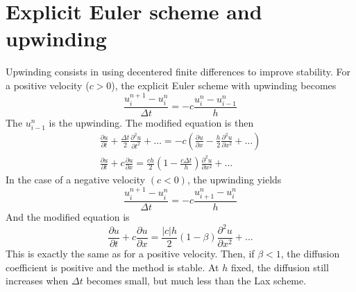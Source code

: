 \documentclass[12pt, openany]{report}
\theoremstyle{definition}
\begin{document}
\section{Explicit Euler scheme and upwinding}
Upwinding consists in using decentered finite differences to improve stability. 
For a positive velocity ($c>0$), the explicit Euler scheme with upwinding becomes 
\begin{equation}
	\frac{u_i^{n+1}-u_i^n}{\Delta t} = -c\frac{u_i^n - u_{i-1}^n}{h}
\end{equation}
The $u_{i-1}^n$ is the upwinding. The modified equation is then 
\begin{equation}
	\begin{aligned}		
		\frac{\partial u}{\partial t} + \frac{\Delta t}{2}\frac{\partial^2u}{\partial t^2} + \dots = -c\left(\frac{\partial u}{\partial x}-\frac{h}{2}\frac{\partial^2 u}{\partial x^2} + \dots\right)\\
		\frac{\partial u}{\partial t} + c\frac{\partial u}{\partial x} = \frac{ch}{2} \left(1-\frac{c\Delta t}{h}\right)\frac{\partial^2 u }{\partial x^2} + \dots 
	\end{aligned}
\end{equation}
In the case of a negative velocity $(c<0)$, the upwinding yields 
\begin{equation}
	\frac{u_i^{n+1}-u_i^n}{\Delta t} = -c \frac{u_{i+1}^n-u_i^n}{h}
\end{equation}
And the modified equation is 
\begin{equation}
	\frac{\partial u}{\partial t} + c\frac{\partial u}{\partial x} = \frac{|c|h}{2}\left(1-\beta\right) \frac{\partial^2 u}{\partial x^2} + \dots
\end{equation}
This is exactly the same as for a positive velocity. Then, if $\beta<1$, the diffusion coefficient is positive and the method is stable. At $h$ fixed, the diffusion still increases when $\Delta t$ becomes small, but much less than the Lax scheme. 
\end{document}
